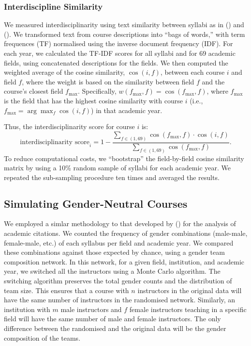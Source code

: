\documentclass[
  british,
  12pt, %
]{article}
\begin{document}
\subsubsection{Interdiscipline Similarity}\label{si-interdisciplinarity}

We measured interdisciplinarity using text similarity between syllabi as in () and (). We transformed text from course descriptions into ``bags of words,'' with term frequences (TF) normalised using the inverse document frequency (IDF). For each year, we calculated the TF-IDF scores for all syllabi and for 69 academic fields, using concatenated descriptions for the fields. We then computed the weighted average of the cosine similarity, \(\cos (i, f)\), between each course \(i\) and field \(f\), where the weight is based on the similarity between field \(f\) and the course's closest field \(f_{\max}\). Specifically, \(w(f_{\max}, f) = \cos(f_{\max}, f)\), where \(f_{\max}\) is the field that has the highest cosine similarity with course \(i\) (i.e., \(f_{\max} = \arg\max_f \cos(i, f)\)) in that academic year.

Thus, the interdisciplinarity score for course \(i\) is:
\[
  \text{interdisciplinarity score}_i = 1 - \frac{\sum_{f \in (1, 69)} \cos(f_{\max}, f) \cdot \cos(i, f)}{\sum_{f \in (1, 69)} \cos(f_{\max}, f)}. 
\]
To reduce computational costs, we ``bootstrap'' the field-by-field cosine similarity matrix by using a 10\% random sample of syllabi for each academic year. We repeated the sub-sampling procedure ten times and averaged the results.

\subsection{Simulating Gender-Neutral Courses}\label{si-simulations}

We employed a simlar methodology to that developed by () for the analysis of academic citations. We counted the frequency of gender combinations (male-male, female-male, etc.) of each syllabus per field and academic year. We compared these combinations against those expected by chance, using a gender team composition network. In this network, for a given field, institution, and academic year, we switched all the instructors using a Monte Carlo algorithm. The switching algorithm preserves the total gender counts and the distribution of team size. This ensures that a course with \(n\) instructors in the original data will have the same number of instructors in the randomised network. Similarly, an institution with \(m\) male instructors and \(f\) female instructors teaching in a specific field will have the same number of male and female instructors. The only difference between the randomised and the original data will be the gender composition of the teams.
\end{document}

